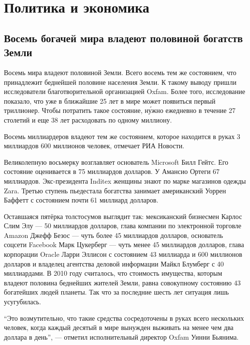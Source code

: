 \chapter{Политика и экономика}

\section{Восемь богачей мира владеют половиной богатств Земли}
Восемь  мира владеют половиной  Земли. Всего восемь   тем же состоянием, что принадлежит беднейшей половине населения Земли. К такому выводу пришли исследователи благотворительной организацией Oxfam. Более того, исследование показало, что уже в ближайшие 25 лет в мире может появиться первый триллионер. Чтобы потратить такое состояние, н\'{у}жно ежедневно в течение 27 столетий и еще 38 лет расходовать по одному миллиону.

Восемь миллиардеров владеют тем же состоянием, которое находится в руках 3 миллиардов 600 миллионов человек, отмечает РИА Новости.

Великолепную восьмерку возглавляет основатель Microsoft Билл Гейтс. Его состояние оценивается в 75 миллиардов долларов. У Амансио Ортеги 67 миллиардов. Экс-президента Inditex женщины знают по марке магазинов одежды Zara. Третью ступень пьедестала богатства занимает американский  Уоррен Баффетт с состоянием почти 61 миллиард долларов.

Оставшаяся пятёрка толстосумов выглядит так: мексиканский бизнесмен Карлос Слим Элу --- 50 миллиардов долларов, глава компании по электронной торговле Amazon Джефф Безос --- чуть более 45 миллиардов долларов, основатель соцсети Facebook Марк Цукерберг --- чуть менее 45 миллиардов долларов, глава корпорации Oracle Ларри Эллисон с состоянием 43 миллиарда и 600 миллионов долларов и владелец агентства деловой информации Майкл Блумберг с 40 миллиардами.
В 2010 году считалось, что стоимость имущества, которым владеют половина беднейших жителей Земли, равна совокупному состоянию 43 богатейших людей планеты. Так что за последние шесть лет ситуация лишь усугубилась.

``Это возмутительно, что такие средства сосредоточены в руках всего нескольких человек, когда каждый десятый в мире вынужден выживать на менее чем два доллара в день'', --- отметил исполнительный директор Oxfam Уинни Бьянима.

